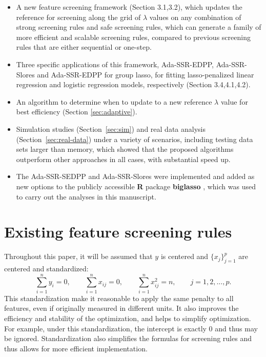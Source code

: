 \begin{itemize}
    \item A new feature screening framework (Section 3.1,3.2), which updates the reference for screening along the grid of $\lambda$ values on any combination of strong screening rules and safe screening rules, which can generate a family of more efficient and scalable screening rules, compared to previous screening rules that are either sequential or one-step.
    \item Three specific applications of this framework, Ada-SSR-EDPP, Ada-SSR-Slores and Ada-SSR-EDPP for group lasso, for fitting lasso-penalized linear regression and logistic regression models, respectively (Section 3.4,4.1,4.2).
    \item An algorithm to determine when to update to a new reference $\lambda$ value for best efficiency (Section \ref{sec:adaptive}).
    \item Simulation studies (Section~\ref{sec:sim}) and real data analysis (Section~\ref{sec:real-data}) under a variety of scenarios, including testing data sets larger than memory, which showed that the proposed algorithms outperform other approaches in all cases, with substantial speed up.
    \item The Ada-SSR-SEDPP and Ada-SSR-Slores were implemented and added as new options to the publicly accessible \textbf{R} package \textbf{biglasso} \citep{zeng2017biglasso}, which was used to carry out the analyses in this manuscript.
\end{itemize}

\section{Existing feature screening rules}
\label{sec:existing}

Throughout this paper, it will be assumed that $y$ is centered and $\{x_j\}_{j=1}^p$ are centered and standardized:
\begin{equation}
    \sum_{i=1}^ny_i=0, \qquad \sum_{i=1}^n x_{ij}=0, \qquad \sum_{i=1}^n x_{ij}^2=n,\qquad j=1,2,...,p.
\end{equation}
This standardization make it reasonable to apply the same penalty to all features, even if originally measured in different units. It also improves the efficiency and stability of the optimization, and helps to simplify optimization.  For example, under this standardization, the intercept is exactly 0 and thus may be ignored.  Standardization also simplifies the formulas for screening rules and thus allows for more efficient implementation.


